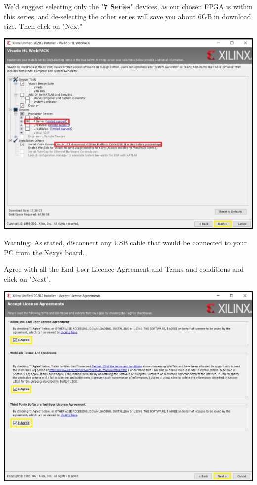 \begin{minipage}{\linewidth}
  We'd suggest selecting only the "\textbf{7 Series}" devices, as our chosen FPGA is within this series, and de-selecting the other series will save you about 6GB in download size. Then click on "Next"
  \\
  \begin{center}
    \includegraphics[width=0.7\linewidth]{images/VivadoInstimg012.png}
  \end{center}
  Warning: As stated, disconnect any USB cable that would be connected to your PC from the Nexys board.
\end{minipage}

\begin{minipage}{\linewidth}
  Agree with all the End User Licence Agreement and Terms and conditions and click on "Next".
  \\
  \begin{center}
    \includegraphics[width=0.7\linewidth]{images/VivadoInstimg013.jpg}
  \end{center}
\end{minipage}

